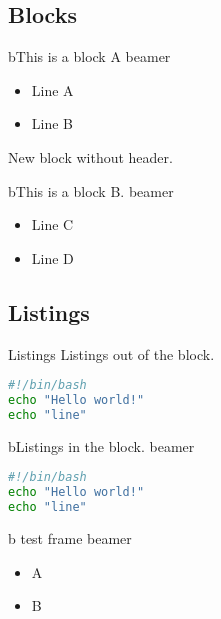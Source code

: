 \documentclass[
  11pt,
  aspectratio=169]{beamer}
\providecommand{\tightlist}{%
  \setlength{\itemsep}{0pt}\setlength{\parskip}{0pt}}
\begin{document}
\subsection{Blocks}\label{blocks}

\begin{frame}{bThis is a block A beamer}
\label{bthis-is-a-block-a-beamer}
\begin{itemize}
\tightlist
\item
  Line A
\item
  Line B
\end{itemize}

New block without header.
\end{frame}

\begin{frame}{bThis is a block B. beamer}
\label{bthis-is-a-block-b.-beamer}
\begin{itemize}
\tightlist
\item
  Line C
\item
  Line D
\end{itemize}
\end{frame}

\subsection{Listings}\label{listings}

\begin{frame}[fragile]{Listings}
Listings out of the block.

\begin{lstlisting}[language=sh]
#!/bin/bash
echo "Hello world!"
echo "line"
\end{lstlisting}
\end{frame}

\begin{frame}[fragile]{bListings in the block. beamer}
\label{blistings-in-the-block.-beamer}
\begin{lstlisting}[language=sh]
#!/bin/bash
echo "Hello world!"
echo "line"
\end{lstlisting}
\end{frame}

\begin{frame}{b test frame beamer}
\label{b-test-frame-beamer}
\begin{itemize}
\tightlist
\item
  A
\item
  B
\end{itemize}
\end{frame}
\end{document}
